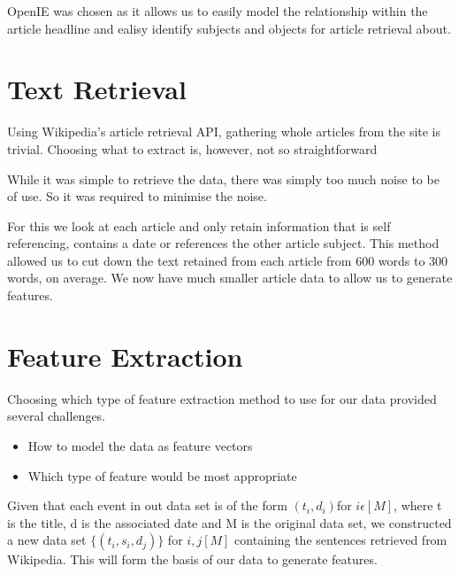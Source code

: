 \documentclass[12pt]{report}
\begin{document}
        OpenIE was chosen as it allows us to easily model the relationship within the article headline
        and ealisy identify subjects and objects for article retrieval about.

        \section{Text Retrieval} %
        Using Wikipedia's article retrieval API, gathering whole articles from
        the site is trivial. Choosing what to extract is, however, not
        so straightforward

        While it was simple to retrieve the data, there was simply too much noise to be of use.
        So it was required to minimise the noise.

        For this we look at each article and only retain information that is self referencing, contains
        a date or references the other article subject.
        This method allowed us to cut down the text retained from each article from 600 words \cite{WikiStats}
        to 300 words, on average. %
        We now have much smaller article data to allow us to generate features.


        \section{Feature Extraction}
                Choosing which type of feature extraction method to use for our data provided several challenges.
                \begin{itemize}
                \item How to model the data as feature vectors
                \item Which type of feature would be most appropriate
                \end{itemize}

                \noindent Given that each event in out data set is of the form $(t_{i},d_{i}) $for $ i \epsilon [M]$,
                where t is the title, d is the associated date and M is the original data set,
                we constructed a new data set $\{(t_{i},s_{i},d_{j})\}$ for $i,j [M]$ containing
                the sentences retrieved from Wikipedia. This will form the basis of our data to generate
                features.
\end{document}
